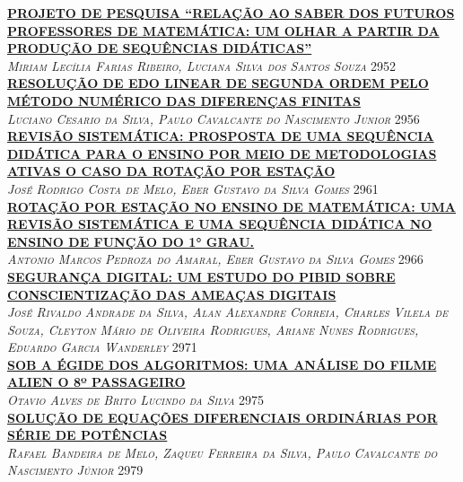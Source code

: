 \noindent \textsc{\hyperlink{trabalhos/251785.pdf.1}{\textbf{PROJETO DE PESQUISA “RELAÇÃO AO SABER DOS FUTUROS PROFESSORES DE MATEMÁTICA: UM OLHAR A PARTIR DA PRODUÇÃO DE SEQUÊNCIAS DIDÁTICAS”}}}\\ 
\noindent \textsc{\textit{Miriam Lecília Farias Ribeiro, Luciana Silva dos Santos Souza}} \hfill 2952\\ 

\noindent \textsc{\hyperlink{trabalhos/249529.pdf.1}{\textbf{RESOLUÇÃO DE EDO LINEAR DE SEGUNDA ORDEM PELO MÉTODO NUMÉRICO DAS DIFERENÇAS FINITAS}}}\\ 
\noindent \textsc{\textit{Luciano Cesario da Silva, Paulo Cavalcante do Nascimento Junior}} \hfill 2956\\ 

\noindent \textsc{\hyperlink{trabalhos/250078.pdf.1}{\textbf{REVISÃO SISTEMÁTICA: PROSPOSTA DE UMA SEQUÊNCIA DIDÁTICA PARA O ENSINO POR MEIO DE METODOLOGIAS ATIVAS O CASO DA ROTAÇÃO POR ESTAÇÃO}}}\\ 
\noindent \textsc{\textit{José Rodrigo Costa de Melo, Eber Gustavo da Silva Gomes}} \hfill 2961\\ 

\noindent \textsc{\hyperlink{trabalhos/249492.pdf.1}{\textbf{ROTAÇÃO POR ESTAÇÃO NO ENSINO DE MATEMÁTICA: UMA REVISÃO SISTEMÁTICA E UMA SEQUÊNCIA DIDÁTICA NO ENSINO DE FUNÇÃO DO 1° GRAU.}}}\\ 
\noindent \textsc{\textit{Antonio Marcos Pedroza do Amaral, Eber Gustavo da Silva Gomes}} \hfill 2966\\ 

\noindent \textsc{\hyperlink{trabalhos/251731.pdf.1}{\textbf{SEGURANÇA DIGITAL: UM ESTUDO DO PIBID SOBRE CONSCIENTIZAÇÃO DAS AMEAÇAS DIGITAIS}}}\\ 
\noindent \textsc{\textit{José Rivaldo Andrade da Silva, Alan Alexandre Correia, Charles Vilela de Souza, Cleyton Mário de Oliveira Rodrigues, Ariane Nunes Rodrigues, Eduardo Garcia Wanderley}} \hfill 2971\\ 

\noindent \textsc{\hyperlink{trabalhos/249084.pdf.1}{\textbf{SOB A ÉGIDE DOS ALGORITMOS: UMA ANÁLISE DO FILME ALIEN O 8º PASSAGEIRO}}}\\ 
\noindent \textsc{\textit{Otavio Alves de Brito Lucindo da Silva}} \hfill 2975\\ 

\noindent \textsc{\hyperlink{trabalhos/251779.pdf.1}{\textbf{SOLUÇÃO DE EQUAÇÕES DIFERENCIAIS ORDINÁRIAS POR SÉRIE DE POTÊNCIAS}}}\\ 
\noindent \textsc{\textit{Rafael Bandeira de Melo, Zaqueu Ferreira da Silva, Paulo Cavalcante do Nascimento Júnior}} \hfill 2979\\ 

